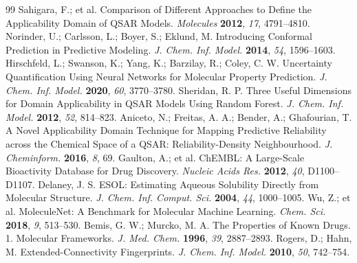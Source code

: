 \documentclass[11pt,letterpaper]{article}
\begin{document}
\begin{thebibliography}{99}
 Sahigara, F.; et al. Comparison of Different Approaches to Define the Applicability Domain of QSAR Models. \textit{Molecules} \textbf{2012}, \textit{17}, 4791--4810.
 Norinder, U.; Carlsson, L.; Boyer, S.; Eklund, M. Introducing Conformal Prediction in Predictive Modeling. \textit{J. Chem. Inf. Model.} \textbf{2014}, \textit{54}, 1596--1603.
 Hirschfeld, L.; Swanson, K.; Yang, K.; Barzilay, R.; Coley, C. W. Uncertainty Quantification Using Neural Networks for Molecular Property Prediction. \textit{J. Chem. Inf. Model.} \textbf{2020}, \textit{60}, 3770--3780.
 Sheridan, R. P. Three Useful Dimensions for Domain Applicability in QSAR Models Using Random Forest. \textit{J. Chem. Inf. Model.} \textbf{2012}, \textit{52}, 814--823.
 Aniceto, N.; Freitas, A. A.; Bender, A.; Ghafourian, T. A Novel Applicability Domain Technique for Mapping Predictive Reliability across the Chemical Space of a QSAR: Reliability-Density Neighbourhood. \textit{J. Cheminform.} \textbf{2016}, \textit{8}, 69.
 Gaulton, A.; et al. ChEMBL: A Large-Scale Bioactivity Database for Drug Discovery. \textit{Nucleic Acids Res.} \textbf{2012}, \textit{40}, D1100--D1107.
 Delaney, J. S. ESOL: Estimating Aqueous Solubility Directly from Molecular Structure. \textit{J. Chem. Inf. Comput. Sci.} \textbf{2004}, \textit{44}, 1000--1005.
 Wu, Z.; et al. MoleculeNet: A Benchmark for Molecular Machine Learning. \textit{Chem. Sci.} \textbf{2018}, \textit{9}, 513--530.
 Bemis, G. W.; Murcko, M. A. The Properties of Known Drugs. 1. Molecular Frameworks. \textit{J. Med. Chem.} \textbf{1996}, \textit{39}, 2887--2893.
 Rogers, D.; Hahn, M. Extended-Connectivity Fingerprints. \textit{J. Chem. Inf. Model.} \textbf{2010}, \textit{50}, 742--754.

\end{thebibliography}
\end{document}
